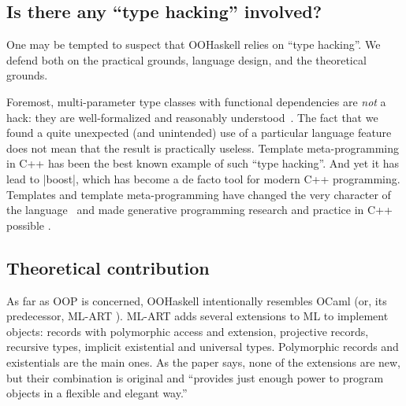 \subsection{Is there any ``type hacking'' involved?}

One may be tempted to suspect that OOHaskell relies on ``type
hacking''. We defend both on the practical grounds, language design,
and the theoretical grounds.

Foremost, multi-parameter type classes with functional dependencies
are \emph{not} a hack: they are well-formalized and reasonably
understood~\cite{SS04}. The fact that we found a quite unexpected (and
unintended) use of a particular language feature does not mean that
the result is practically useless. Template meta-programming in C++
has been the best known example of such ``type hacking''. And yet it
has lead to |boost|, which has become a de facto tool for modern C++
programming.
%
%
Templates and template meta-programming have changed the very
character of the language~\cite{fcpp-jfp} and made generative
programming research and practice in C++ possible
\cite{DSL-in-three-lang,siek05:_concepts_cpp0x}.

\begin{comment}
[Stroustrup interview?
  Need some reference. If we can't find any, I can use LtU references
  \url{http://lambda-the-ultimate.org/node/view/663} (see comments by
  Scott Johnson)
  \url{http://lambda-the-ultimate.org/node/view/663#comment-5839} See
  also:
  \url{http://spirit.sourceforge.net/distrib/spirit_1_7_0/libs/spirit/phoenix/doc/preface.html}
] 


An ICFP reviewer wrote:
``The result might seem poor and just containing clever tricks
however it took 10 years to obtain that proof of concepts and this
deserves attention.''
\end{comment}





\subsection{Theoretical contribution}

As far as OOP is concerned, OOHaskell intentionally resembles OCaml
(or, its predecessor, ML-ART \cite{ML-ART}).  ML-ART adds several
extensions to ML to implement objects: records with polymorphic access
and extension, projective records, recursive types, implicit
existential and universal types. Polymorphic records and existentials
are the main ones. As the paper \cite{ML-ART} says, none of the
extensions are new, but their combination is original and ``provides
just enough power to program objects in a flexible and elegant way.''

